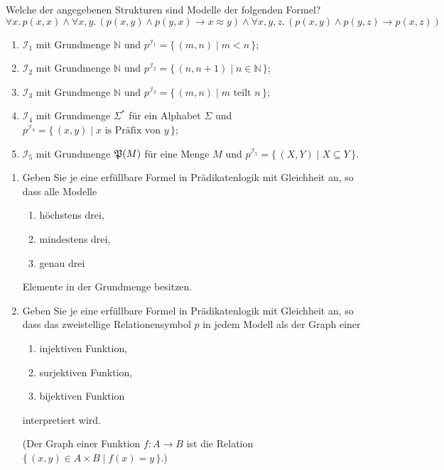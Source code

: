 \documentclass[german]{latteachCD}[2017/03/28]
\begin{document}
\setcounter{exercise}{0}

\enlargethispage{2\baselineskip}

\begin{exercise}
  Welche der angegebenen Strukturen sind Modelle der folgenden Formel?
  \begin{equation*}
    \forall x.\, p(x,x) \land \forall x, y.\, (p(x,y) \land
      p(y,x) \to x \approx y)
    \land \forall x, y, z.\, (p(x,y) \land p(y,z) \to p(x,z))
  \end{equation*}
  \begin{enumerate}
  \item $\mathcal{I}_{1}$ mit Grundmenge $\mathbb N$ und $p^{\mathcal{I}_{1}} =
    \{\,(m,n) \mid m < n \,\}$;
  \item $\mathcal{I}_{2}$ mit Grundmenge $\mathbb N$ und $p^{\mathcal{I}_{2}} =
    \{\,(n,n+1) \mid n \in \mathbb N \,\}$;
  \item $\mathcal{I}_{3}$ mit Grundmenge $\mathbb N$ und $p^{\mathcal{I}_{3}} =
    \{\,(m,n) \mid m \text{ teilt } n\,\}$;
  \item $\mathcal{I}_{4}$ mit Grundmenge $\Sigma^{*}$ für ein Alphabet $\Sigma$
    und $p^{\mathcal{I}_{4}} = \{\,(x,y) \mid x \text{ is Präfix von } y\,\}$;
  \item $\mathcal{I}_{5}$ mit Grundmenge $\mathfrak{P}(M)$ für eine Menge $M$ und
    $p^{\mathcal{I}_{5}} = \{\,(X,Y) \mid X \subseteq Y\,\}$.
  \end{enumerate}
\end{exercise}

\begin{exercise}
  \begin{enumerate}
  \item Geben Sie je eine erfüllbare Formel in Prädikatenlogik mit Gleichheit
    an, so dass alle Modelle
    \begin{enumerate}
    \item höchstens drei,
    \item mindestens drei,
    \item genau drei
    \end{enumerate}
    Elemente in der Grundmenge besitzen.
  \item Geben Sie je eine erfüllbare Formel in Prädikatenlogik mit Gleichheit
    an, so dass das zweistellige Relationensymbol $p$ in jedem Modell als der
    Graph einer
    \begin{enumerate}
    \item injektiven Funktion,
    \item surjektiven Funktion,
    \item bijektiven Funktion
    \end{enumerate}
    interpretiert wird.

    (Der Graph einer Funktion $f \colon A \to B$ ist die Relation $\{\,(x,y) \in
    A \times B \mid f(x) = y\,\}$.)
  \end{enumerate}
\end{exercise}
\end{document}
